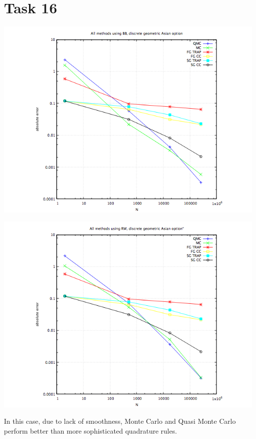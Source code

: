 \documentclass[10pt,a4paper]{article}
\begin{document}
\section*{Task 16}
\begin{center}
\includegraphics[scale=0.5]{task16bb.png}
\end{center}
\begin{center}
\includegraphics[scale=0.5]{task16rw.png}
\end{center}
In this case, due to lack of smoothness, Monte Carlo and Quasi Monte Carlo perform better than more sophisticated quadrature rules. 
\end{document}
